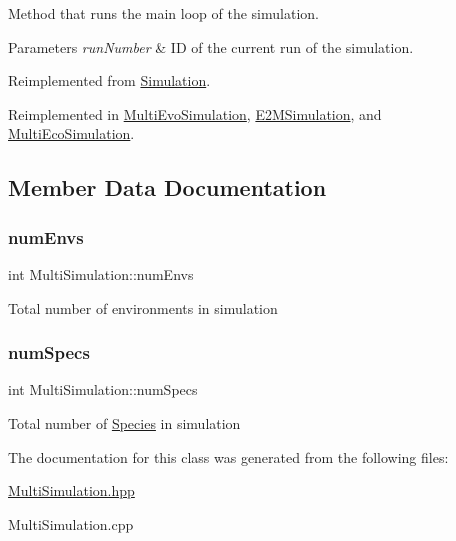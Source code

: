 Method that runs the main loop of the simulation. 


\begin{DoxyParams}{Parameters}
{\em run\+Number} & ID of the current run of the simulation. \\
\hline
\end{DoxyParams}


Reimplemented from \hyperlink{classSimulation_a7eb16da89581b496d33b77efbb63b9cd}{Simulation}.



Reimplemented in \hyperlink{classMultiEvoSimulation_a89c9806ac998c06230cdd41cc6a532bf}{Multi\+Evo\+Simulation}, \hyperlink{classE2MSimulation_aeac4e92c10f89a5c953ace5b1327d20b}{E2\+M\+Simulation}, and \hyperlink{classMultiEcoSimulation_ad490e089c083d06d80c62af9e1564ac3}{Multi\+Eco\+Simulation}.



\subsection{Member Data Documentation}
\hypertarget{classMultiSimulation_ac49cc927d6f96d4fda4ff010abc5041a}{}\label{classMultiSimulation_ac49cc927d6f96d4fda4ff010abc5041a} 
\subsubsection{\texorpdfstring{num\+Envs}{numEnvs}}
{\footnotesize\ttfamily int Multi\+Simulation\+::num\+Envs\hspace{0.3cm}{\ttfamily [protected]}}

Total number of environments in simulation \hypertarget{classMultiSimulation_a383fa1e045cf0e1e7314708c89cb6312}{}\label{classMultiSimulation_a383fa1e045cf0e1e7314708c89cb6312} 
\subsubsection{\texorpdfstring{num\+Specs}{numSpecs}}
{\footnotesize\ttfamily int Multi\+Simulation\+::num\+Specs\hspace{0.3cm}{\ttfamily [protected]}}

Total number of \hyperlink{classSpecies}{Species} in simulation 

The documentation for this class was generated from the following files\+:\begin{DoxyCompactItemize}
\item 
\hyperlink{MultiSimulation_8hpp}{Multi\+Simulation.\+hpp}\item 
Multi\+Simulation.\+cpp\end{DoxyCompactItemize}
